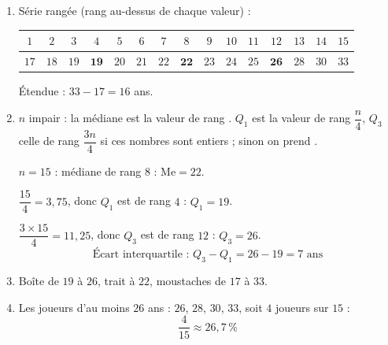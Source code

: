 \begin{enumerate}[itemsep=14pt]
  \item Série rangée (rang au-dessus de chaque valeur) :
  \begin{center}\small
  \begin{tabular}{|*{15}{c|}}\hline
  $1$&$2$&$3$&$4$&$5$&$6$&$7$&$8$&$9$&$10$&$11$&$12$&$13$&$14$&$15$\\\hline
  $17$&$18$&$19$&$\mathbf{19}$&$20$&$21$&$22$&$\mathbf{22}$&$23$&$24$&$25$&$\mathbf{26}$&$28$&$30$&$33$\\\hline
  \end{tabular}\end{center}
  Étendue : $33-17=16$ ans.

  \item
  \begin{prop}
  $n$ impair : la médiane est la valeur de rang .
  $Q_1$ est la valeur de rang $\dfrac n4$, $Q_3$ celle de rang $\dfrac{3n}{4}$ si ces nombres sont entiers ; sinon on prend .
  \end{prop}
  $n=15$ : médiane de rang $8$ : $\text{Me}=22$.

  $\dfrac{15}{4}=3{,}75$, donc $Q_1$ est de rang $4$ : $Q_1=19$.

  $\dfrac{3\times15}{4}=11{,}25$, donc $Q_3$ est de rang $12$ : $Q_3=26$.
  \[\text{Écart interquartile : }Q_3-Q_1=26-19=7\text{ ans}\]

  \item
  \begin{center}
  \end{center}
  Boîte de $19$ à $26$, trait à $22$, moustaches de $17$ à $33$.

  \item Les joueurs d'au moins $26$ ans : $26$, $28$, $30$, $33$, soit $4$ joueurs sur $15$ :
  \[\dfrac{4}{15}\approx26{,}7\,\%\]
\end{enumerate}
